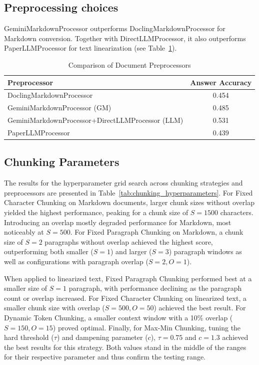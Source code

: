 \documentclass[12pt]{article} %
\begin{document}
\subsection{Preprocessing choices}
GeminiMarkdownProcessor outperforms DoclingMarkdownProcessor for Markdown conversion. Together with DirectLLMProcessor, it also outperforms PaperLLMProcessor for text linearization (see Table~\ref{tab:preprocessor_comparison}).
\begin{table}[htbp]
    \centering
    \caption{Comparison of Document Preprocessors}
    \label{tab:preprocessor_comparison}
    \begin{tabular}{lc}
        \toprule
        \textbf{Preprocessor}                      & \textbf{Answer Accuracy} \\
        \midrule
        DoclingMarkdownProcessor                   & 0.454                    \\
        GeminiMarkdownProcessor (GM)                    & 0.485                    \\
        GeminiMarkdownProcessor+DirectLLMProcessor (LLM) & 0.531                    \\
        PaperLLMProcessor                          & 0.439                    \\
        \bottomrule
    \end{tabular}
\end{table}

\subsection{Chunking Parameters}

The results for the hyperparameter grid search across chunking strategies and preprocessors are presented in Table~\ref{tab:chunking_hyperparameters}. For Fixed Character Chunking on Markdown documents, larger chunk sizes without overlap yielded the highest performance, peaking for a chunk size of $S = 1500$ characters. Introducing an overlap mostly degraded performance for Markdown, most noticeably at $S = 500$. For Fixed Paragraph Chunking on Markdown, a chunk size of $S = 2$ paragraphs without overlap achieved the highest score, outperforming both smaller ($S = 1$) and larger ($S = 3$) paragraph windows as well as configurations with paragraph overlap ($S = 2, O = 1$).

When applied to linearized text, Fixed Paragraph Chunking performed best at a smaller size of $S = 1$ paragraph, with performance declining as the paragraph count or overlap increased. For Fixed Character Chunking on linearized text, a smaller chunk size with overlap ($S = 500, O = 50$) achieved the best result.
For Dynamic Token Chunking, a smaller context window with a 10\% overlap ($S = 150, O = 15$) proved optimal.
Finally, for Max-Min Chunking, tuning the hard threshold ($\tau$) and dampening parameter ($c$), $\tau = 0.75$ and $c = 1.3$ achieved the best results for this strategy. Both values stand in the middle of the ranges for their respective parameter and thus confirm the testing range.
\end{document}
